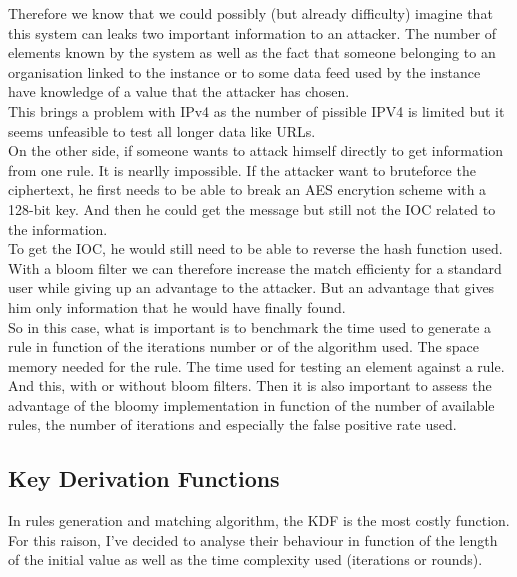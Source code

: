 \documentclass{eplmastersthesis}
\begin{document}
Therefore we know that we could possibly (but already difficulty) imagine that this system can leaks two important information to an attacker. The number of elements known by the system as well as the fact that someone belonging to an organisation linked to the instance or to some data feed used by the instance have knowledge of a value that the attacker has chosen.\\
This brings a problem with IPv4 as the number of pissible IPV4 is limited but it seems unfeasible to test all longer data like URLs.\\

On the other side, if someone wants to attack himself directly to get information from one rule. It is nearlly impossible. If the attacker want to bruteforce the ciphertext, he first needs to be able to break an AES encrytion scheme with a 128-bit key. And then he could get the message but still not the IOC related to the information.\\
To get the IOC, he would still need to be able to reverse the hash function used.\\

With a bloom filter we can therefore increase the match efficienty for a standard user while giving up an advantage to the attacker. But an advantage that gives him only information that he would have finally found.\\

So in this case, what is important is to benchmark the time used to generate a rule in function of the iterations number or of the algorithm used. The space memory needed for the rule. The time used for testing an element against a rule.\\
And this, with or without bloom filters. Then it is also important to assess the advantage of the bloomy implementation in function of the number of available rules, the number of iterations and especially the false positive rate used.

\subsection{Key Derivation Functions}
In rules generation and matching algorithm, the KDF is the most costly function. For this raison, I've decided to analyse their behaviour in function of the length of the initial value as well as the time complexity used (iterations or rounds).\\

\end{document}

